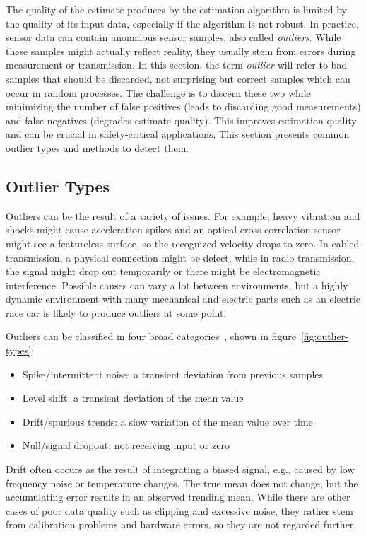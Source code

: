 The quality of the estimate produces by the estimation algorithm is limited by the quality of its input data, especially if the algorithm is not robust. In practice, sensor data can contain anomalous sensor samples, also called \textit{outliers}. While these samples might actually reflect reality, they usually stem from errors during measurement or transmission. In this section, the term \textit{outlier} will refer to bad samples that should be discarded, not surprising but correct samples which can occur in random processes. The challenge is to discern these two while minimizing the number of false positives (leads to discarding good measurements) and false negatives (degrades estimate quality). This improves estimation quality and can be crucial in safety-critical applications. This section presents common outlier types and methods to detect them.


\subsection{Outlier Types}
Outliers can be the result of a variety of issues. For example, heavy vibration and shocks might cause acceleration spikes and an optical cross-correlation sensor might see a featureless surface, so the recognized velocity drops to zero. In cabled transmission, a physical connection might be defect, while in radio transmission, the signal might drop out temporarily or there might be electromagnetic interference. Possible causes can vary a lot between environments, but a highly dynamic environment with many mechanical and electric parts such as an electric race car is likely to produce outliers at some point.

Outliers can be classified in four broad categories~\cites[p.~19]{Kabzan.2019}[p.~165~ff.]{Himmelblau.1994}, shown in figure~\ref{fig:outlier-types}:
\begin{itemize}
\item Spike/intermittent noise: a transient deviation from previous samples
\item Level shift: a transient deviation of the mean value
\item Drift/spurious trends: a slow variation of the mean value over time
\item Null/signal dropout: not receiving input or zero
\end{itemize}
Drift often occurs as the result of integrating a biased signal, e.g., caused by low frequency noise or temperature changes. The true mean does not change, but the accumulating error results in an observed trending mean. While there are other cases of poor data quality such as clipping and excessive noise, they rather stem from calibration problems and hardware errors, so they are not regarded further.

